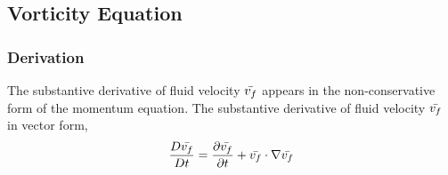 \documentclass[a4paper, 12pt]{report}
\begin{document}
\begin{center}
\subsection{Vorticity Equation}
\begin{comment}

It is important that in the other works, the body acceleration is denoted as \b{F_b}, CHANGE IT TO \b{g_b}. This is important because \b{F_b} is misleading. We don't mean force, we mean the acceleration vector. So use \b{g_b} instead.


Results of a few reflections, we cannot just say that \f{D\rho}{Dt} = 0 for continuity. If we are to expand using \f{D\rho}{Dt} = 0, we will obtain the form, 0 = \f{\p\rho}{\p t} + v_i \f{\p\rho}{\p x_i}. The actual continuity governing equation: 0 = \f{\p\rho}{\p t} + \rho\f{\p}{\p x_j}(v_j) + v_j\f{\p\rho}{\p x_j}. Now if the divergence of velocity is zero, then the general continuity governing equation DEGENERATES into 0 = \f{D\rho}{Dt}. This means that that the observation 0 = \f{D\rho}{Dt} is only true for incompressible flow and could not represent the most general case of the continuity of fluids. Since an observation 0 = \f{D\rho}{Dt} fails to yield the most general case, then it is safe to assume that similar observations such as \b{a} = \f{D\b{v_f}}{Dt} will also likely fail to capture the full generality of the momentum governing equation.

Non-conervative form of the momentum equation referenced, please add the proof in a different part!

Please enforce consistency in notation. Please make sure that \b{v_f} is used when referring to fluid velocity throughout other documents. 



Things to automate:
    includegraphics commands

\end{comment}
\subsubsection{Derivation}
\begin{comment}
\end{comment}

The substantive derivative of fluid velocity $\bar{v_f}$ appears in the non-conservative form of the momentum equation. The substantive derivative of fluid velocity $\bar{v_f}$ in vector form,
$$\frac{D \bar{v_f}}{Dt} = \frac{\partial \bar{v_f}}{\partial t} + \bar{v_f}\cdot\nabla\bar{v_f}$$



\end{center}
\end{document}
